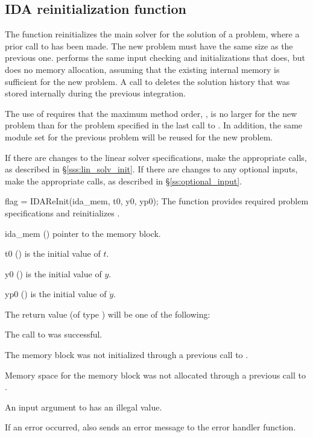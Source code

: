 {%

\subsection{IDA reinitialization function}\label{sss:idareinit}

The function  reinitializes the main {\ida} solver for
the solution of a problem, where a prior call to  has
been made. The new problem must have the same size as the previous one.
 performs the same input checking and initializations 
that  does, but does no memory allocation, assuming that the 
existing internal memory is sufficient for the new problem.
A call to  deletes the solution history that was stored
internally during the previous integration.

The use of  requires that the maximum method order,    
, is no larger for the new problem than for the problem  
specified in the last call to .  In addition, the same
{\nvector} module set for the previous problem
will be reused for the new problem.

If there are changes to the linear solver specifications, make the
appropriate  calls, as described in \S\ref{sss:lin_solv_init}.
If there are changes to any optional inputs, make the appropriate
 calls, as described in \S\ref{ss:optional_input}.

{
  flag = IDAReInit(ida\_mem, t0, y0, yp0);
}
{
  The function  provides required problem specifications 
  and reinitializes {\ida}.
}
{
  \begin{args}
  \item[ida\_mem] ()
    pointer to the {\ida} memory block.
  \item[t0] ()
    is the initial value of $t$.
  \item[y0] ()
    is the initial value of $y$. 
  \item[yp0] ()
    is the initial value of $\dot{y}$.   
  \end{args}
}
{
  The return value  (of type ) will be one of the following:
  \begin{args}
  \item[\Id{IDA\_SUCCESS}]
    The call to  was successful.
  \item[\Id{IDA\_MEM\_NULL}] 
    The {\ida} memory block was not initialized through a 
    previous call to .
  \item[\Id{IDA\_NO\_MALLOC}] 
    Memory space for the {\ida} memory block was not allocated through a 
    previous call to .
  \item[\Id{IDA\_ILL\_INPUT}] 
    An input argument to  has an illegal value.
  \end{args}
}
{
  If an error occurred,  also sends an error message to the
  error handler function.
}


}

